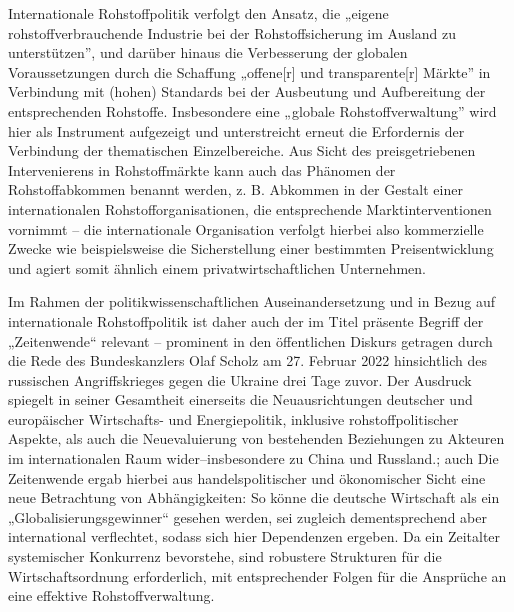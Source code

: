 \documentclass[12pt,a4paper,oneside]{book} %
\begin{document}
	Internationale Rohstoffpolitik verfolgt den Ansatz, die „eigene rohstoffverbrauchende Industrie bei der Rohstoffsicherung im Ausland zu unterstützen”, und darüber hinaus die Verbesserung der globalen Voraussetzungen durch die Schaffung „offene[r] und transparente[r] Märkte” in Verbindung mit (hohen) Standards bei der Ausbeutung und Aufbereitung der entsprechenden Rohstoffe.\autocite{acatech__deutsche_akademie_der_technikwissenschaften_rohstoffe_2017} Insbesondere eine „globale Rohstoffverwaltung” wird hier als Instrument aufgezeigt und unterstreicht erneut die Erfordernis der Verbindung der thematischen Einzelbereiche. Aus Sicht des preisgetriebenen Intervenierens in Rohstoffmärkte kann auch das Phänomen der Rohstoffabkommen benannt werden, z. B. Abkommen in der Gestalt einer internationalen Rohstofforganisationen, die entsprechende Marktinterventionen vornimmt – die internationale Organisation verfolgt hierbei also kommerzielle Zwecke wie beispielsweise die Sicherstellung einer bestimmten Preisentwicklung und agiert somit ähnlich einem privatwirtschaftlichen Unternehmen.\autocite[Paragraph 11, Rn. 4]{herdegen_internationales_2020}
	
	Im Rahmen der politikwissenschaftlichen Auseinandersetzung und in Bezug auf internationale Rohstoffpolitik ist daher auch der im Titel präsente Begriff der „Zeitenwende“ relevant – prominent in den öffentlichen Diskurs getragen durch die Rede des Bundeskanzlers Olaf Scholz am 27. Februar 2022 hinsichtlich des russischen Angriffskrieges gegen die Ukraine drei Tage zuvor.\autocite{deutsche_bundesregierung_reden_2022} Der Ausdruck spiegelt in seiner Gesamtheit einerseits die Neuausrichtungen deutscher und europäischer Wirtschafts- und Energiepolitik, inklusive rohstoffpolitischer Aspekte, als auch die Neuevaluierung von bestehenden Beziehungen zu Akteuren im internationalen Raum wider--insbesondere zu China und Russland.\autocite[siehe auch][Rn. 741-746]{moser_zeitenwende_2022}; auch \autocite{[695-701]schaffer_ausenwirtschaftsrecht_2023} Die Zeitenwende ergab hierbei aus handelspolitischer und ökonomischer Sicht eine neue Betrachtung von Abhängigkeiten: So könne die deutsche Wirtschaft als ein „Globalisierungsgewinner“ gesehen werden, sei zugleich dementsprechend aber international verflechtet, sodass sich hier Dependenzen ergeben.\autocite{machnig_zeitenwende_2023} Da ein Zeitalter systemischer Konkurrenz bevorstehe, sind robustere Strukturen für die Wirtschaftsordnung erforderlich,\autocite{europaische_kommission_globale_2015} mit entsprechender Folgen für die Ansprüche an eine effektive Rohstoffverwaltung.
	
\end{document}
